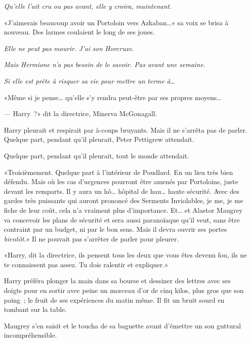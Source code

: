 \emph{Qu'elle l'ait cru ou pas avant, elle y croira, maintenant.}

«J'aimerais beaucoup avoir un Portoloin vers Azkaban…» sa voix se brisa à nouveau. Des larmes coulaient le long de ses joues.

\emph{Elle ne peut pas mourir. J'ai son Horcruxe.}

\emph{Mais Hermione n'a pas besoin de le savoir. Pas avant une semaine.}

\emph{Si elle est prête à risquer sa vie pour mettre un terme à…}

«Même si je pense… qu'elle s'y rendra peut-être par ses propres moyens…

--- Harry~?» dit la directrice, Minerva McGonagall.

Harry pleurait et respirait par à-coups bruyants. Mais il ne s'arrêta pas de parler. Quelque part, pendant qu'il pleurait, Peter Pettigrew attendait.

Quelque part, pendant qu'il pleurait, tout le monde attendait.

«Troisièmement. Quelque part à l'intérieur de Poudlard. En un lieu très bien défendu. Mais où les cas d'urgences pourront être amenés par Portoloins, juste devant les remparts. Il y aura un hô… hôpital de hau… haute sécurité. Avec des gardes très puissants qui auront prononcé des Serments Inviolables, je me, je me fiche de leur coût, cela n'a vraiment plus d'importance. Et… et Alastor Maugrey va concevoir les plans de sécurité et sera aussi paranoïaque qu'il veut, sans être contraint par un budget, ni par le bon sens. Mais il devra ouvrir ses portes \emph{bientôt}.» Il ne pouvait pas s'arrêter de parler pour pleurer.

«Harry, dit la directrice, ils pensent tous les deux que vous êtes devenu fou, ils ne te connaissent pas assez. Tu dois ralentir et expliquer.»

Harry préféra plonger la main dans sa bourse et dessiner des lettres avec ses doigts pour en sortir avec peine un morceau d'or de cinq kilos, plus gros que son poing~; le fruit de ses expériences du matin même. Il fit un bruit sourd en tombant sur la table.

Maugrey s'en saisit et le toucha de sa baguette avant d'émettre un son guttural incompréhensible.

